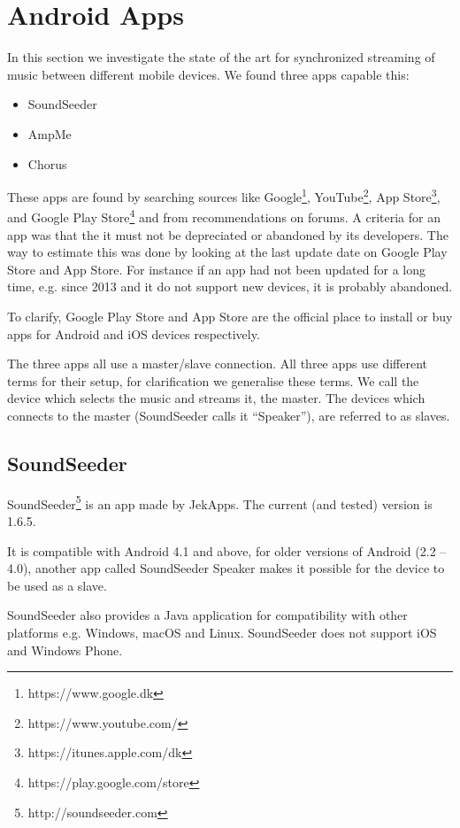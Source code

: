 \section{Android Apps}\label{sec:sota_apps}
In this section we investigate the state of the art for synchronized streaming of music between different mobile devices.
We found three apps capable this:
\begin{itemize}
    \item SoundSeeder
    \item AmpMe
    \item Chorus
\end{itemize}

These apps are found by searching sources like Google\footnote{https://www.google.dk}, YouTube\footnote{https://www.youtube.com/}, App Store\footnote{https://itunes.apple.com/dk}, and Google Play Store\footnote{https://play.google.com/store} and from recommendations on forums. 
A criteria for an app was that the it must not be depreciated or abandoned by its developers.
The way to estimate this was done by looking at the last update date on Google Play Store and App Store.
For instance if an app had not been updated for a long time, e.g. since 2013 and it do not support new devices, it is probably abandoned.

To clarify, Google Play Store and App Store are the official place to install or buy apps for Android and iOS devices respectively.

The three apps all use a master/slave connection.
All three apps use different terms for their setup, for clarification we generalise these terms. 
We call the device which selects the music and streams it, the master.
The devices which connects to the master (SoundSeeder calls it ``Speaker''), are referred to as slaves.

\subsection{SoundSeeder}\label{subsec:soundseeder}
SoundSeeder\footnote{http://soundseeder.com} is an app made by JekApps. 
The current (and tested) version is 1.6.5.

It is compatible with Android 4.1 and above, for older versions of Android (2.2 -- 4.0),
another app called SoundSeeder Speaker makes it possible for the device to be used as a slave.

SoundSeeder also provides a Java application for compatibility with other platforms e.g. Windows, macOS and Linux.
SoundSeeder does not support iOS and Windows Phone\cite{soundseeder_ios}.

